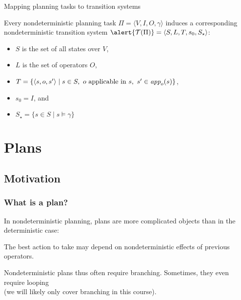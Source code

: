 \documentclass{gkibeamer}
\begin{document}
\begin{frame}{Mapping planning tasks to transition systems}
  \begin{definition}
    Every nondeterministic planning task $\Pi = \langle
    V,I,O,\gamma\rangle$ induces a corresponding nondeterministic
    transition system $\alert{\mathcal T(\Pi)} = \langle S, L, T, s_0,
    S_\star\rangle$:
    \begin{itemize}
    \item $S$ is the set of all states over $V$,
    \item $L$ is the set of operators $O$,
    \item $T = \{ \langle s, o, s'\rangle \mid
      s \in S,~ o \text{~applicable in~}s,~ s' \in \textit{app}_{o}(s)\}$,
    \item $s_0 = I$, and
    \item $S_\star = \{ s \in S \mid s \models \gamma\}$
    \end{itemize}
  \end{definition}
\end{frame}

\section{Plans}

\subsection{Motivation}

\begin{frame}
  \frametitle{What is a plan?}
  
  In nondeterministic planning, plans are more complicated
  objects than in the deterministic case:

  \medskip

  The best action to take may \alert{depend} on nondeterministic
  effects of previous operators.

  \medskip

  Nondeterministic plans thus often require \alert{branching}.
  Sometimes, they even require \alert{looping}\\
  (we will likely only cover branching in this course).
\end{frame}
\end{document}

